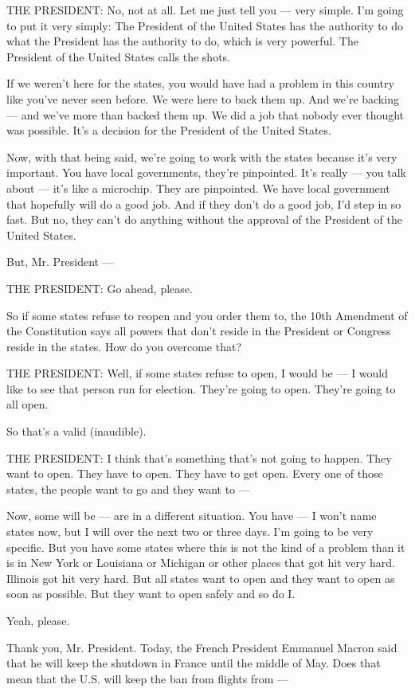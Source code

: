 THE PRESIDENT: No, not at all. Let me just tell you --- very simple. I'm
going to put it very simply: The President of the United States has the
authority to do what the President has the authority to do, which is
very powerful. The President of the United States calls the shots.

If we weren't here for the states, you would have had a problem in this
country like you've never seen before. We were here to back them up. And
we're backing --- and we've more than backed them up. We did a job that
nobody ever thought was possible. It's a decision for the President of
the United States.

Now, with that being said, we're going to work with the states because
it's very important. You have local governments, they're pinpointed.
It's really --- you talk about --- it's like a microchip. They are
pinpointed. We have local government that hopefully will do a good job.
And if they don't do a good job, I'd step in so fast. But no, they can't
do anything without the approval of the President of the United States.

But, Mr. President ---

THE PRESIDENT: Go ahead, please.

So if some states refuse to reopen and you order them to, the 10th
Amendment of the Constitution says all powers that don't reside in the
President or Congress reside in the states. How do you overcome that?

THE PRESIDENT: Well, if some states refuse to open, I would be --- I
would like to see that person run for election. They're going to open.
They're going to all open.

So that's a valid (inaudible).

THE PRESIDENT: I think that's something that's not going to happen. They
want to open. They have to open. They have to get open. Every one of
those states, the people want to go and they want to ---

Now, some will be --- are in a different situation. You have --- I won't
name states now, but I will over the next two or three days. I'm going
to be very specific. But you have some states where this is not the kind
of a problem than it is in New York or Louisiana or Michigan or other
places that got hit very hard. Illinois got hit very hard. But all
states want to open and they want to open as soon as possible. But they
want to open safely and so do I.

Yeah, please.

Thank you, Mr. President. Today, the French President Emmanuel Macron
said that he will keep the shutdown in France until the middle of May.
Does that mean that the U.S. will keep the ban from flights from ---

